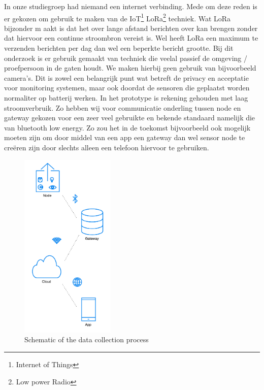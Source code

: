 \documentclass{below-ext}
\begin{document}
In onze studiegroep had niemand een internet verbinding. Mede om deze reden is er gekozen om gebruik te maken van de IoT\footnote{Internet of Things} LoRa\footnote{Low power Radio} techniek. Wat LoRa bijzonder m
aakt is dat het over lange afstand berichten over kan brengen zonder dat hiervoor een continue stroombron vereist is. Wel heeft LoRa een maximum te verzenden berichten per dag dan wel een beperkte bericht grootte. Bij dit onderzoek is er gebruik gemaakt van techniek die veelal passief de omgeving / proefpersoon in de gaten houdt. We maken hierbij geen gebruik van bijvoorbeeld camera's. Dit is zowel een belangrijk punt wat betreft de privacy en acceptatie voor monitoring systemen, maar ook doordat de sensoren die geplaatst worden normaliter op batterij werken. In het prototype is rekening gehouden met laag stroomverbruik. Zo hebben wij voor communicatie onderling tussen node en gateway gekozen voor een zeer veel gebruikte en bekende standaard namelijk die van bluetooth low energy. Zo zou het in de toekomst bijvoorbeeld ook mogelijk moeten zijn om door middel van een app een gateway dan wel sensor node te creëren zijn door slechts alleen een telefoon hiervoor te gebruiken. 

\begin{figure}
\center
\includegraphics[width=0.4\textwidth]{dataproces.pdf}
\caption{Schematic of the data collection process}
\end{figure}
\end{document}
